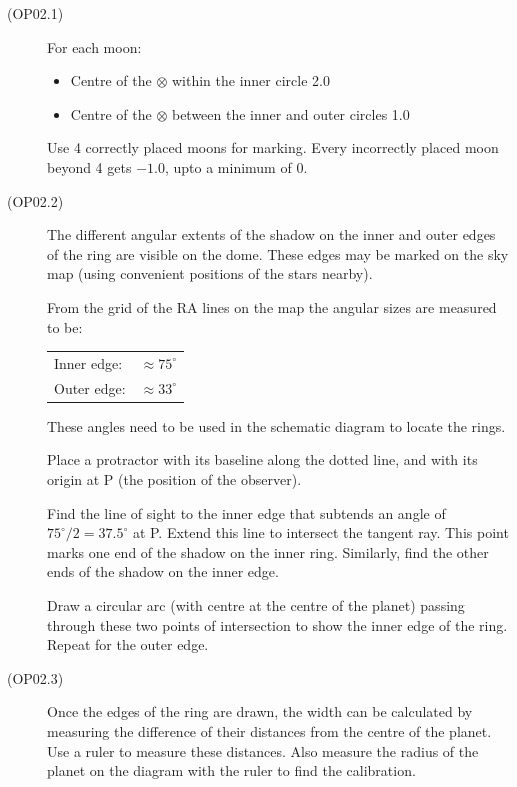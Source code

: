 \begin{description}
\item[(OP02.1)]
For each moon:
\begin{itemize}
\item Centre of the $\otimes$ within the inner circle \hfill 2.0
\item Centre of the $\otimes$ between the inner and outer circles \hfill 1.0
\end{itemize}
Use 4 correctly placed moons for marking. Every incorrectly placed moon beyond 4 gets
$-1.0$, upto a minimum of 0. %

\item[(OP02.2)]
The different angular extents of the shadow on the inner and outer edges of the ring are
visible on the dome. These edges may be marked on the sky map (using convenient positions
of the stars nearby).

From the grid of the RA lines on the map the angular sizes are measured to be:
\begin{center}
\begin{tabular}{ll}
Inner edge: & $\approx 75^\circ$\\
Outer edge: & $\approx 33^\circ$\\
\end{tabular}
\end{center}
These angles need to be used in the schematic diagram to locate the rings.

Place a protractor with its baseline along the dotted line, and with its origin at P (the
position of the observer).

Find the line of sight to the inner edge that subtends an angle of $75^\circ/2 = 37.5^\circ$
at P. Extend this line to intersect the tangent ray. This point marks one end of the shadow
on the inner ring. Similarly, find the other ends of the shadow on the inner edge.

Draw a circular arc (with centre at the centre of the planet) passing through these two
points of intersection to show the inner edge of the ring. Repeat for the outer edge.

\item[(OP02.3)]
Once the edges of the ring are drawn, the width can be calculated by measuring the
difference of their distances from the centre of the planet. Use a ruler to measure these
distances. Also measure the radius of the planet on the diagram with the ruler to find the
calibration.


\end{description}

